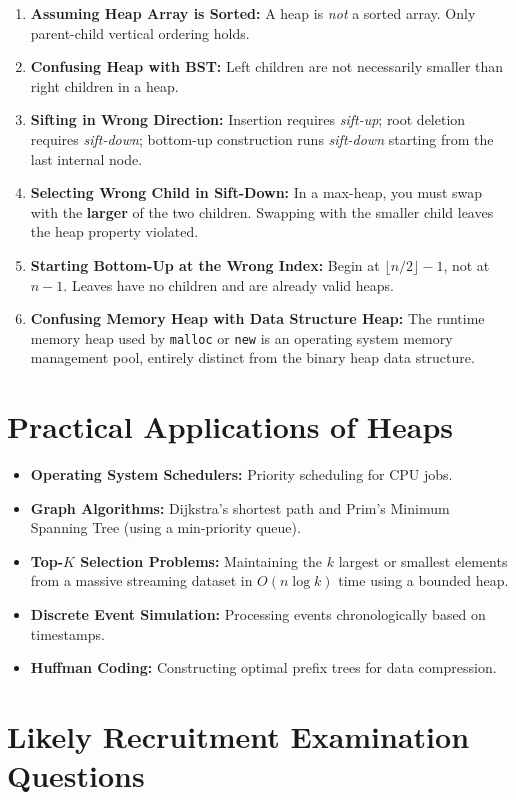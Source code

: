 \begin{enumerate}
    \item \textbf{Assuming Heap Array is Sorted:} A heap is \emph{not} a sorted array. Only parent-child vertical ordering holds.
    \item \textbf{Confusing Heap with BST:} Left children are not necessarily smaller than right children in a heap.
    \item \textbf{Sifting in Wrong Direction:} Insertion requires \emph{sift-up}; root deletion requires \emph{sift-down}; bottom-up construction runs \emph{sift-down} starting from the last internal node.
    \item \textbf{Selecting Wrong Child in Sift-Down:} In a max-heap, you must swap with the \textbf{larger} of the two children. Swapping with the smaller child leaves the heap property violated.
    \item \textbf{Starting Bottom-Up at the Wrong Index:} Begin at $\lfloor n/2 \rfloor - 1$, not at $n-1$. Leaves have no children and are already valid heaps.
    \item \textbf{Confusing Memory Heap with Data Structure Heap:} The runtime memory heap used by \texttt{malloc} or \texttt{new} is an operating system memory management pool, entirely distinct from the binary heap data structure.
\end{enumerate}

\section{Practical Applications of Heaps}
\begin{itemize}
    \item \textbf{Operating System Schedulers:} Priority scheduling for CPU jobs.
    \item \textbf{Graph Algorithms:} Dijkstra's shortest path and Prim's Minimum Spanning Tree (using a min-priority queue).
    \item \textbf{Top-$K$ Selection Problems:} Maintaining the $k$ largest or smallest elements from a massive streaming dataset in $O(n \log k)$ time using a bounded heap.
    \item \textbf{Discrete Event Simulation:} Processing events chronologically based on timestamps.
    \item \textbf{Huffman Coding:} Constructing optimal prefix trees for data compression.
\end{itemize}

\section{Likely Recruitment Examination Questions}


